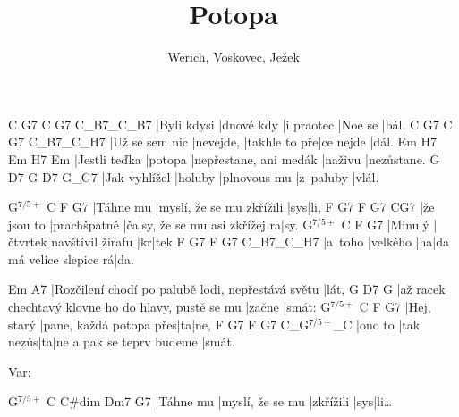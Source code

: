 \documentclass{song}
\title{Potopa}
\author{Werich, Voskovec, Ježek}
\newcommand{\+}{$^{7/5+}$}
\begin{document}
\strophe
C           G7         C          G7      C_B7_C_B7
|Byli kdysi |dnové kdy |i praotec |Noe se |bál.
C              G7        C             G7        C_B7_C_H7
|Už se sem nic |nevejde, |takhle to pře|ce nejde |dál.
Em            H7      Em                     H7      Em
|Jestli teďka |potopa |nepřestane, ani medák |naživu |nezůstane.
G             D7      G            D7        G_G7
|Jak vyhlížel |holuby |plnovous mu |z~paluby |vlál.
\endstrophe

\strophe
G\+       C                         F   G7
|Táhne mu |myslí, že se mu zkřížili |sys|li,
F           G7           F  G7                          C\quad{}G7
|že jsou to |prachšpatné |ča|sy, že se mu asi zkřížej ra|sy.
G\+     C                         F  G7
|Minulý |čtvrtek navštívil žirafu |kr|tek
F       G7       F  G7                      C_B7_C_H7
|a~toho |velkého |ha|da má velice slepice rá|da.
\endstrophe

\strophe
Em                                                A7
|Rozčilení chodí po palubě lodi, nepřestává světu |lát,
G                                                   D7    G
|až racek chechtavý klovne ho do hlavy, pustě se mu |začne |smát:
G\+         C                       F  G7
|Hej, starý |pane, každá potopa přes|ta|ne,
F       G7        F  G7                        C_G\+_C
|ono to |tak nezůs|ta|ne a pak se teprv budeme |smát.
\endstrophe


Var:

\strophe
G\+       C                C#dim    Dm7 G7
|Táhne mu |myslí, že se mu |zkřížili |sys|li\ldots
\endstrophe
\end{document}
